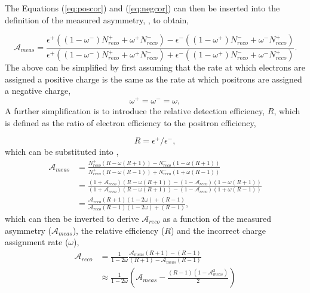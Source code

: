 The Equations (\ref{eq:poscor}) and (\ref{eq:negcor}) can then be inserted
into the definition of the measured asymmetry, , to obtain,

\begin{equation}
\label{eq:meas1}
\mathcal{A}_{meas} = \frac{
  \epsilon^+ ( ( 1 - \omega^- ) N_{reco}^{+} + \omega^+ N_{reco}^{-} ) -
  \epsilon^- ( ( 1 - \omega^+ ) N_{reco}^{-} + \omega^- N_{reco}^{+} )
}
{
  \epsilon^+ ( ( 1 - \omega^- ) N_{reco}^{+} + \omega^+ N_{reco}^{-} ) +
  \epsilon^- ( ( 1 - \omega^+ ) N_{reco}^{-} + \omega^- N_{reco}^{+} )
} .
\end{equation}
The above can be simplified by first assuming that the rate at which
electrons are assigned a positive charge is the same as the rate at which positrons
are assigned a negative charge, \ie\cite{baisini2010electron} 
\begin{equation}
  \omega^{+} = \omega^{-} = \omega ,
\end{equation}
A further simplification is to introduce the relative detection efficiency, $R$,
which is defined as the ratio of electron efficiency to the positron efficiency,

\begin{equation}
 R = \epsilon^+/\epsilon^- ,
\end{equation}
which can be substituted into ,
\begin{align}
\mathcal{A}_{meas} 
&= \frac{
  N_{reco}^{+} (R - \omega(R+1)) -
  N_{reco}^{-} (1 - \omega(R+1))
}
{
  N_{reco}^{+} (R - \omega(R-1)) +
  N_{reco}^{-} (1 + \omega(R-1))
}\\
&= \frac{
  (1+\mathcal{A}_{reco}) (R - \omega(R+1)) -
  (1-\mathcal{A}_{reco}) (1 - \omega(R+1))
}
{
  (1+\mathcal{A}_{reco}) (R - \omega(R+1)) -
  (1-\mathcal{A}_{reco}) (1 + \omega(R-1))
}\\
&= \frac{
  \mathcal{A}_{reco} (R + 1)(1 - 2 \omega) + (R - 1)
}
{
  \mathcal{A}_{reco} (R - 1)(1 - 2 \omega) + (R - 1)
},
\end{align}
which can then be inverted to derive $\mathcal{A}_{reco}$ as a function of the
measured asymmetry ($\mathcal{A}_{meas}$), the relative efficiency ($R$) and the
incorrect charge assignment rate ($\omega$),
\begin{align}
\mathcal{A}_{reco}
&=\frac{1}{1-2\omega}
  \frac{
    \mathcal{A}_{meas} (R + 1) - (R-1)
  }
  {
    (R + 1) - \mathcal{A}_{meas} (R-1)
  }\\
&\approx \frac{1}{1-2\omega}
\left(
  \mathcal{A}_{meas} -
\frac{ (R - 1)(1 - \mathcal{A}_{meas}^{2}) } { 2 }
\right)
\end{align}


